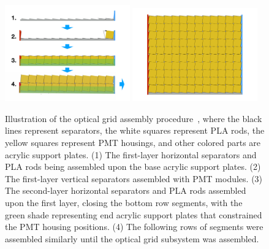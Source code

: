 \begin{figure}[h!]
\centering
\includegraphics[width=0.48\textwidth]{Figures/OGAssemble1.pdf}
\includegraphics[width=0.48\textwidth]{Figures/OGAssemble2.pdf}
\caption[Optical grid assembly illustration]{Illustration of the optical grid assembly procedure~\cite{bib:prospect_og}, where the black lines represent separators, the white squares represent PLA rods, the yellow squares represent PMT housings, and other colored parts are acrylic support plates.
(1) The first-layer horizontal separators and PLA rods being assembled upon the base acrylic support plates.
(2) The first-layer vertical separators assembled with PMT modules.
(3) The second-layer horizontal separators and PLA rods assembled upon the first layer, closing the bottom row segments, with the green shade representing end acrylic support plates that constrained the PMT housing positions.
(4) The following rows of segments were assembled similarly until the optical grid subsystem was assembled.
}
\label{fig:assemble_procedure}
\end{figure}

